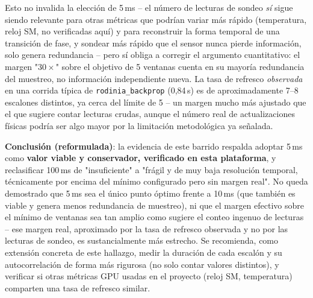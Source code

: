 Esto no invalida la elección de 5\,ms -- el número de lecturas de sondeo
\emph{sí} sigue siendo relevante para otras métricas que podrían variar
más rápido (temperatura, reloj SM, no verificadas aquí) y para reconstruir
la forma temporal de una transición de fase, y sondear más rápido que el
sensor nunca pierde información, solo genera redundancia -- pero sí obliga
a corregir el argumento cuantitativo: el margen "$30\times$" sobre el
objetivo de 5 ventanas cuenta en su mayoría redundancia del muestreo, no
información independiente nueva. La tasa de refresco \emph{observada} en
una corrida típica de \texttt{rodinia\_backprop} (0{,}84\,s) es de
aproximadamente 7--8 escalones distintos, ya cerca del límite de 5 -- un
margen mucho más ajustado que el que sugiere contar lecturas crudas,
aunque el número real de actualizaciones físicas podría ser algo mayor por
la limitación metodológica ya señalada.

\textbf{Conclusión (reformulada)}: la evidencia de este barrido respalda
adoptar 5\,ms como \textbf{valor viable y conservador, verificado en esta
plataforma}, y reclasificar 100\,ms de "insuficiente" a "frágil y de muy
baja resolución temporal, técnicamente por encima del mínimo configurado
pero sin margen real". No queda demostrado que 5\,ms sea el único punto
óptimo frente a 10\,ms (que también es viable y genera menos redundancia
de muestreo), ni que el margen efectivo sobre el mínimo de ventanas sea
tan amplio como sugiere el conteo ingenuo de lecturas -- ese margen real,
aproximado por la tasa de refresco observada y no por las lecturas de
sondeo, es sustancialmente más estrecho. Se recomienda, como extensión
concreta de este hallazgo, medir la duración de cada escalón y su
autocorrelación de forma más rigurosa (no solo contar valores distintos),
y verificar si otras métricas GPU usadas en el proyecto (reloj SM,
temperatura) comparten una tasa de refresco similar.
